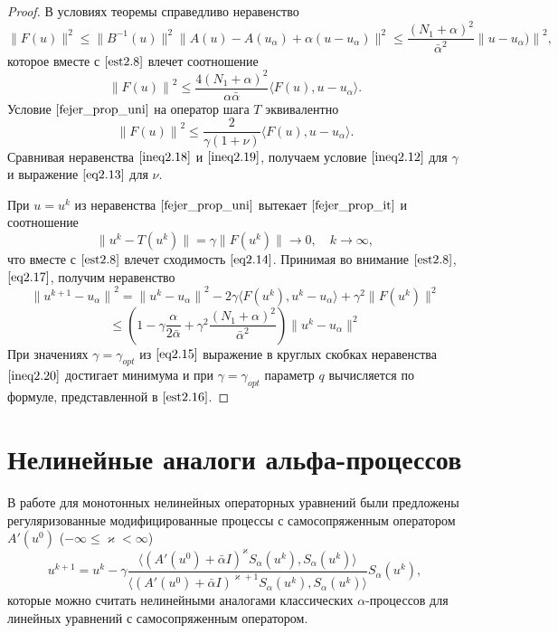 \begin{proof}
В условиях теоремы справедливо неравенство
\begin{equation}\label{eq2.17}
\|F(u)\|^2\le\|B^{-1}(u)\|^2\|A(u)-A(u_\alpha)+\alpha(u-u_\alpha)\|^2 \le \frac{(N_1+\alpha)^2}{\bar\alpha^2}{\|u-u_\alpha)\|}^2,
\end{equation}
которое вместе с $\eqref{est2.8}$ влечет соотношение
\begin{equation}\label{ineq2.18}
{\|F(u)\|}^2 \le \frac{4(N_1+\alpha)^2}{\alpha\bar\alpha}\langle F(u), u-u_\alpha\rangle.
\end{equation}
Условие $\eqref{fejer_prop_uni}$ на оператор шага $T$ эквивалентно 
\begin{equation}\label{ineq2.19}
{\|F(u)\|}^2 \le \frac{2}{\gamma(1+\nu)}\langle F(u), u-u_\alpha\rangle.
\end{equation}
Сравнивая неравенства $\eqref{ineq2.18}$ и $\eqref{ineq2.19}$, получаем условие $\eqref{ineq2.12}$ для $\gamma$ и выражение $\eqref{eq2.13}$ для $\nu$.

При $u=u^k$ из неравенства $\eqref{fejer_prop_uni}$ вытекает $\eqref{fejer_prop_it}$ и соотношение
$$ \|u^k-T(u^k)\|=\gamma\|F(u^k)\|\to 0, \quad k\to\infty,$$ что вместе с $\eqref{est2.8}$ влечет сходимость $\eqref{eq2.14}$.
Принимая во внимание $\eqref{est2.8}$, $\eqref{eq2.17}$, получим неравенство
$$ {\|u^{k+1}-u_\alpha\|}^2={\|u^k-u_\alpha\|}^2-2\gamma\langle F(u^k), u^k-u_\alpha\rangle+{\gamma}^2\|F(u^k)\|^2 $$
\begin{equation}\label{ineq2.20}
\le \left (1-\gamma\frac{\alpha}{2\bar\alpha}+{\gamma}^2\frac{(N_1+\alpha)^2}{{\bar\alpha}^2}\right )\|u^k-u_\alpha\|^2
\end{equation}
При значениях $\gamma={\gamma}_{opt}$ из $\eqref{eq2.15}$ выражение в круглых скобках неравенства $\eqref{ineq2.20}$ достигает минимума и при $\gamma={\gamma}_{opt}$ параметр $q$ вычисляется по формуле, представленной в $\eqref{est2.16}$.
\end{proof}

\newpage
\section{Нелинейные аналоги альфа-процессов}

В работе \cite{Vasin2016} для монотонных нелинейных операторных уравнений были предложены регуляризованные модифицированные процессы с самосопряженным оператором $A'(u^0)$ ($-\infty \le \varkappa <\infty$)
$$
u^{k+1}=u^k-\gamma\frac{\langle (A'(u^0)+\bar\alpha I)^{\varkappa}S_\alpha(u^k), S_\alpha(u^k)\rangle }{\langle(A'(u^0)+\bar\alpha I)^{\varkappa+1}S_\alpha(u^k), S_\alpha(u^k)\rangle }S_\alpha(u^k),
$$
которые можно считать нелинейными аналогами классических $\alpha$-процессов для линейных уравнений с самосопряженным оператором.

